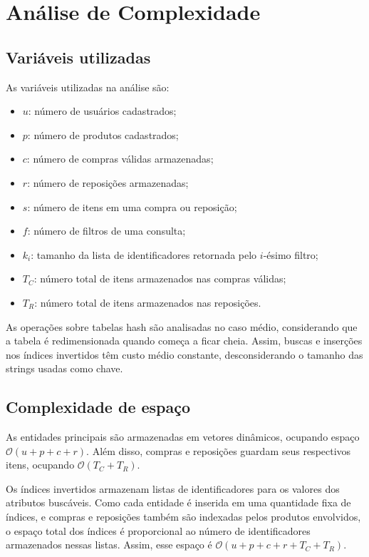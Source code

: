 \documentclass[11pt,a4paper]{article}
\begin{document}
\section{Análise de Complexidade}

\subsection{Variáveis utilizadas}

As variáveis utilizadas na análise são:

\begin{itemize}
    \item \(u\): número de usuários cadastrados;
    \item \(p\): número de produtos cadastrados;
    \item \(c\): número de compras válidas armazenadas;
    \item \(r\): número de reposições armazenadas;
    \item \(s\): número de itens em uma compra ou reposição;
    \item \(f\): número de filtros de uma consulta;
    \item \(k_i\): tamanho da lista de identificadores retornada pelo \(i\)-ésimo filtro;
    \item \(T_C\): número total de itens armazenados nas compras válidas;
    \item \(T_R\): número total de itens armazenados nas reposições.
\end{itemize}

As operações sobre tabelas hash são analisadas no caso médio, considerando que a tabela é redimensionada quando começa a ficar cheia. Assim, buscas e inserções nos índices invertidos têm custo médio constante, desconsiderando o tamanho das strings usadas como chave.

\subsection{Complexidade de espaço}

As entidades principais são armazenadas em vetores dinâmicos, ocupando espaço \(\mathcal{O}(u + p + c + r)\). Além disso, compras e reposições guardam seus respectivos itens, ocupando \(\mathcal{O}(T_C + T_R)\).

Os índices invertidos armazenam listas de identificadores para os valores dos atributos buscáveis. Como cada entidade é inserida em uma quantidade fixa de índices, e compras e reposições também são indexadas pelos produtos envolvidos, o espaço total dos índices é proporcional ao número de identificadores armazenados nessas listas. Assim, esse espaço é \(\mathcal{O}(u + p + c + r + T_C + T_R)\).
\end{document}
